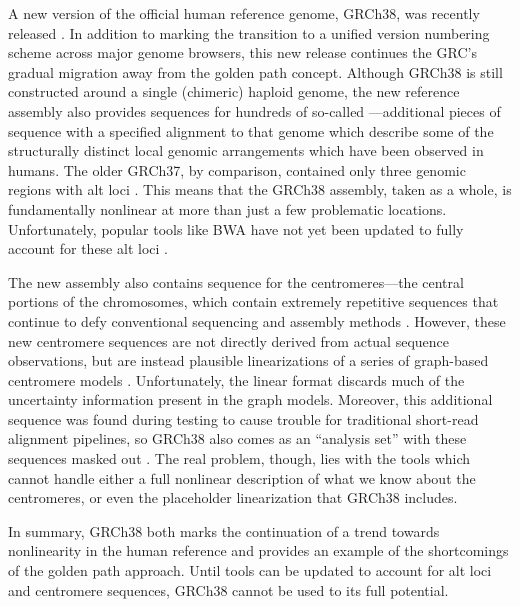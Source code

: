 \documentclass[11pt,proposal]{ucthesis}
\begin{document}
A new version of the official human reference genome, GRCh38, was recently released \cite{karolchik2014new}. In addition to marking the transition to a unified version numbering scheme across major genome browsers, this new release continues the GRC's gradual migration away from the golden path concept. Although GRCh38 is still constructed around a single (chimeric) haploid genome, the new reference assembly also provides sequences for hundreds of so-called ---additional pieces of sequence with a specified alignment to that genome which describe some of the structurally distinct local genomic arrangements which have been observed in humans. The older GRCh37, by comparison, contained only three genomic regions with alt loci \cite{church2011modernizing}. This means that the GRCh38 assembly, taken as a whole, is fundamentally nonlinear at more than just a few problematic locations. Unfortunately, popular tools like BWA have not yet been updated to fully account for these alt loci \cite{li2014bwa}.

The new assembly also contains sequence for the centromeres---the central portions of the chromosomes, which contain extremely repetitive sequences that continue to defy conventional sequencing and assembly methods \cite{karolchik2014new}. However, these new centromere sequences are not directly derived from actual sequence observations, but are instead plausible linearizations of a series of graph-based centromere models \cite{miga2014centromere}. Unfortunately, the linear format discards much of the uncertainty information present in the graph models. Moreover, this additional sequence was found during testing to cause trouble for traditional short-read alignment pipelines, so GRCh38 also comes as an ``analysis set'' with these sequences masked out \cite{karolchik2014new}. The real problem, though, lies with the tools which cannot handle either a full nonlinear description of what we know about the centromeres, or even the placeholder linearization that GRCh38 includes.

In summary, GRCh38 both marks the continuation of a trend towards nonlinearity in the human reference and provides an example of the shortcomings of the golden path approach. Until tools can be updated to account for alt loci and centromere sequences, GRCh38 cannot be used to its full potential.


    
    
\end{document}
